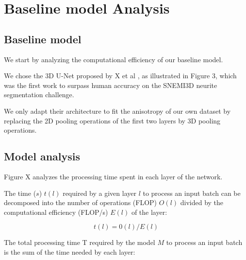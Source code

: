 \documentclass[runningheads]{llncs}
\begin{document}
\section{Baseline model Analysis}



\subsection{Baseline model}




We start by analyzing the computational efficiency of our baseline model.

We chose the 3D U-Net proposed by X et al \cite{}, as illustrated in Figure 3, which was the first work to surpass human accuracy on the SNEMI3D neurite segmentation challenge.

We only adapt their architecture to fit the anisotropy of our own dataset by replacing the 2D pooling operations of the first two layers by 3D pooling operations.





\subsection{Model analysis}









Figure X analyzes the processing time spent in each layer of the network.



The time ($s$) $t(l)$ required by a given layer $l$ to process an input batch can be decomposed into the number of operations (FLOP) $O(l)$ divided by the computational efficiency (FLOP/s) $E(l)$ of the layer:



$$t(l) = 0(l) / E(l) $$



The total processing time T required by the model $M$ to process an input batch is the sum of the time needed by each layer:
\end{document}
